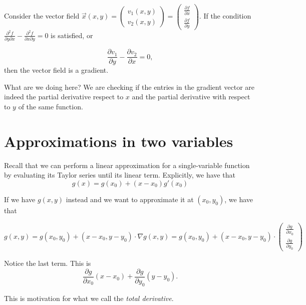 \documentclass[a4paper, 12pt,oneside,openany]{book}
\begin{document}
 {Consider the vector field $\vec{x}(x, y) = \begin{pmatrix} v_1(x, y) \\ v_2(x, y) \end{pmatrix} = \begin{pmatrix} \frac{\partial f}{\partial x} \\ \frac{\partial f}{\partial y} \end{pmatrix}$. If the condition $\frac{\partial^2 f}{\partial y\partial x} - \frac{\partial^2 f}{\partial x\partial y} =0$ is satisfied, or

$$\frac{\partial v_1}{\partial y} - \frac{\partial v_2}{\partial x} =0,$$ then the vector field is a gradient.}

What are we doing here? We are checking if the entries in the gradient vector are indeed the partial derivative respect to $x$ and the partial derivative with respect to $y$ of the same function.

\section{Approximations in two variables}

Recall that we can perform a linear approximation for a single-variable function by evaluating its Taylor series until its linear term. Explicitly, we have that $$g(x) = g(x_0)+(x-x_0) g'(x_0)$$

If we have $g(x, y)$ instead and we want to approximate it at $(x_0, y_0)$, we have that 

$$g(x, y) = g(x_0, y_0) + (x-x_0, y-y_0) \cdot \nabla g(x, y) = g(x_0, y_0) + (x-x_0, y-y_0) \cdot \begin{pmatrix} \frac{\partial g}{\partial x_0} \\ \frac{\partial g}{\partial y_0} \end{pmatrix} $$

Notice the last term. This is $$\frac{\partial g}{\partial x_0}(x-x_0) + \frac{\partial g}{\partial y_0}(y-y_0).$$

This is motivation for what we call the \emph{total derivative}.

\end{document}

